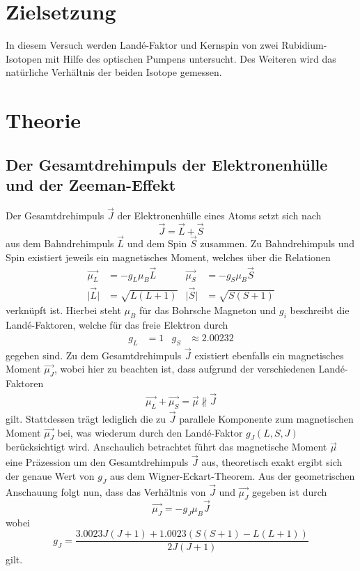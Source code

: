 \section{Zielsetzung}
In diesem Versuch werden Land\'{e}-Faktor und Kernspin von zwei Rubidium-Isotopen mit Hilfe des optischen Pumpens untersucht.
Des Weiteren wird das natürliche Verhältnis der beiden Isotope gemessen.

\section{Theorie}
\label{sec:Theorie}

\subsection{Der Gesamtdrehimpuls der Elektronenhülle und der Zeeman-Effekt}
Der Gesamtdrehimpuls $\vec{J}$ der Elektronenhülle eines Atoms setzt sich nach
\begin{equation}
  \vec{J} = \vec{L} + \vec{S}
\end{equation}
aus dem Bahndrehimpuls $\vec{L}$ und dem Spin $\vec{S}$ zusammen.
Zu Bahndrehimpuls und Spin existiert jeweils ein magnetisches Moment, welches über die Relationen
\begin{align}
  \vec{\mu_L} &= - g_L \mu_B \vec{L} & \vec{\mu_S} &= - g_S \mu_B \vec{S} \\
  \lvert \vec{L} \rvert &= \sqrt{L(L+1)} & \lvert \vec{S} \rvert &= \sqrt{S(S+1)}
\end{align}
verknüpft ist.
Hierbei steht $\mu_B$ für das Bohrsche Magneton und $g_i$ beschreibt die Land\'{e}-Faktoren, welche für das freie Elektron durch
\begin{align}
  \label{eqn:5}
  g_L &= 1 & g_S &\approx \num{2.00232}
\end{align}
gegeben sind.
Zu dem Gesamtdrehimpuls $\vec{J}$ existiert ebenfalls ein magnetisches Moment $\vec{\mu_J}$, wobei hier zu beachten ist, dass aufgrund der verschiedenen Land\'{e}-Faktoren
\begin{align*}
  \vec{\mu_L} + \vec{\mu_S} = \vec{\mu} \nparallel \vec{J}
\end{align*}
gilt.
Stattdessen trägt lediglich die zu $\vec{J}$ parallele Komponente zum magnetischen Moment $\vec{\mu_J}$ bei, was wiederum durch den Land\'{e}-Faktor $g_J(L, S, J)$ berücksichtigt wird.
Anschaulich betrachtet führt das magnetische Moment $\vec{\mu}$ eine Präzession um den Gesamtdrehimpuls $\vec{J}$ aus, theoretisch exakt ergibt sich der genaue Wert von $g_J$ aus dem Wigner-Eckart-Theorem.
Aus der geometrischen Anschauung folgt nun, dass das Verhältnis von $\vec{J}$ und $\vec{\mu_J}$ gegeben ist durch
\begin{equation}
  \vec{\mu_J} = - g_J \mu_B \vec{J}
\end{equation}
wobei
\begin{equation}
  \label{eqn:gj}
  g_J = \frac{ \num{3.0023} J \left(J+1\right) + \num{1.0023} \left( S \left( S+1 \right) - L \left(L+1\right) \right) }{ 2 J \left(J+1\right) }
\end{equation}
gilt. \\

